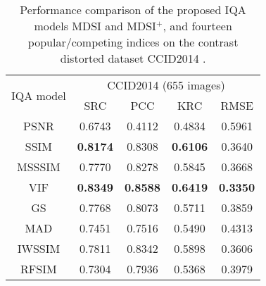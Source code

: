 \begin{table}[htb]
\scriptsize
\centering
\caption{Performance comparison of the proposed IQA models MDSI and MDSI$^+$, and fourteen popular/competing indices on the contrast distorted dataset CCID2014 \cite{CCID2014}.}
\label{resultsC}
\begin{tabular}{c|cccc}
\hline
\multirow{2}{*}{IQA model}    & \multicolumn{4}{c}{CCID2014 (655 images)}                                                                                                             \\ \cline{2-5} 
                              & SRC                                 & PCC                                 & KRC                                 & RMSE                                \\ \hline
PSNR                          & 0.6743                              & 0.4112                              & 0.4834                              & 0.5961                              \\
SSIM \cite{SSIM}                          & \textbf{0.8174}                     & 0.8308                              & \textbf{0.6106}                     & 0.3640                              \\
MSSSIM \cite{MSSSIM}                       & 0.7770                              & 0.8278                              & 0.5845                              & 0.3668                              \\
VIF \cite{VIF}                           & \textbf{0.8349}                     & \textbf{0.8588}                     & \textbf{0.6419}                     & \textbf{0.3350}                     \\
GS \cite{GS}                            & 0.7768                              & 0.8073                              & 0.5711                              & 0.3859                              \\
MAD \cite{MAD}                           & 0.7451                              & 0.7516                              & 0.5490                              & 0.4313                              \\
IWSSIM \cite{IWSSIM}                        & 0.7811                              & 0.8342                              & 0.5898                              & 0.3606                              \\
RFSIM \cite{RFSIM}                         & 0.7304                              & 0.7936                              & 0.5368                              & 0.3979                              \\

\end{tabular}
\end{table}
